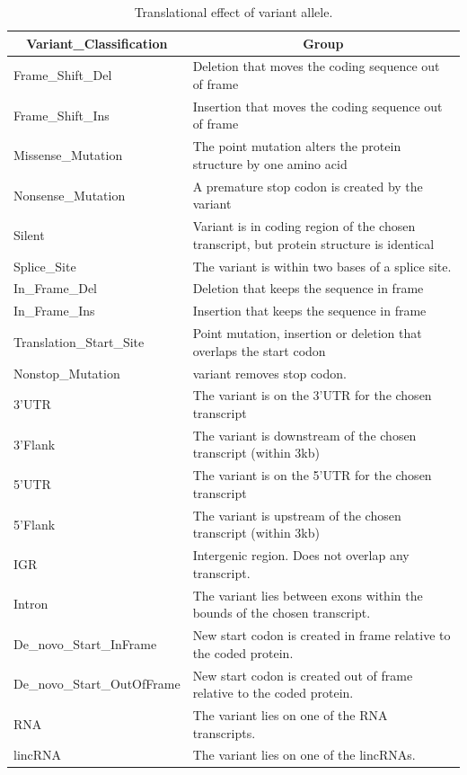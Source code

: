 \begin{landscape}

\begin{table}[]
\centering
\caption{Translational effect of variant allele. \cite{GTAK_maf}}
\label{mutation-effect}
\begin{tabular}{@{}ll@{}}
\toprule
\toprule
\multicolumn{1}{c}{\textbf{Variant\_Classification}} & \multicolumn{1}{c}{\textbf{Group}} \\ \midrule \midrule
Frame\_Shift\_Del & Deletion that moves the coding sequence out of frame \\
Frame\_Shift\_Ins & Insertion that moves the coding sequence out of frame \\
Missense\_Mutation &  The point mutation alters the protein structure by one amino acid \\
Nonsense\_Mutation & A premature stop codon is created by the variant \\
Silent & Variant is in coding region of the chosen transcript, but protein structure is identical \\
Splice\_Site & The variant is within two bases of a splice site.  \\
In\_Frame\_Del & Deletion that keeps the sequence in frame \\
In\_Frame\_Ins & Insertion that keeps the sequence in frame \\
Translation\_Start\_Site & Point mutation, insertion or deletion that overlaps the start codon \\
Nonstop\_Mutation & variant removes stop codon. \\
3'UTR & The variant is on the 3'UTR for the chosen transcript \\
3'Flank & The variant is downstream of the chosen transcript (within 3kb) \\
5'UTR & The variant is on the 5'UTR for the chosen transcript \\
5'Flank & The variant is upstream of the chosen transcript (within 3kb) \\
IGR & Intergenic region. Does not overlap any transcript. \\
Intron & The variant lies between exons within the bounds of the chosen transcript. \\
De\_novo\_Start\_InFrame & New start codon is created in frame relative to the coded protein. \\
De\_novo\_Start\_OutOfFrame & New start codon is created out of frame relative to the coded protein. \\
RNA & The variant lies on one of the RNA transcripts. \\
lincRNA & The variant lies on one of the lincRNAs. \\\bottomrule
\end{tabular}
\end{table}

\end{landscape}
